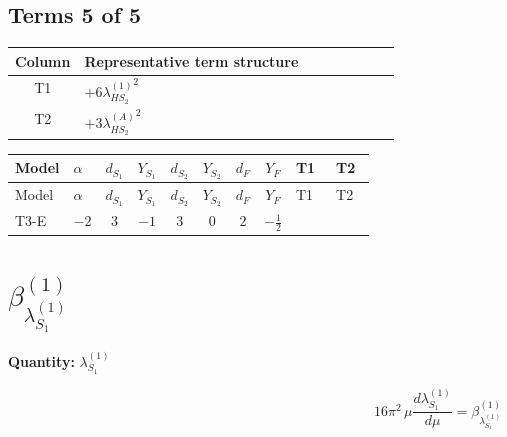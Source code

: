 \documentclass[8pt]{article}
\begin{document}
\begin{landscape}
\subsection*{Terms 5 of 5}
\begin{center}
\begin{tabular}{@{}c >{\raggedright\arraybackslash}p{0.82\linewidth}@{}}
\toprule
Column & Representative term structure \\
\midrule
T1 & \(\displaystyle +6 {\lambda_{HS_2}^{(1)}}^2\) \\
\midrule
T2 & \(\displaystyle +3 {\lambda_{HS_2}^{(A)}}^2\) \\
\midrule
\bottomrule
\end{tabular}
\end{center}
\smallskip
\tiny
\begin{longtable}{@{}llcccccc >{\raggedright\arraybackslash}p{0.21\linewidth} >{\raggedright\arraybackslash}p{0.21\linewidth}@{}}
\toprule
Model & $\alpha$ & $d_{S_1}$ & $Y_{S_1}$ & $d_{S_2}$ & $Y_{S_2}$ & $d_F$ & $Y_F$ & T1 & T2 \\
\midrule
\endfirsthead
\toprule
Model & $\alpha$ & $d_{S_1}$ & $Y_{S_1}$ & $d_{S_2}$ & $Y_{S_2}$ & $d_F$ & $Y_F$ & T1 & T2 \\
\midrule
\endhead
T3-E & $-2$ & $3$ & $-1$ & $3$ & $0$ & $2$ & $-\frac{1}{2}$ & \scriptsize\adjustbox{max width=\linewidth}{$\begin{gathered} +6 {\lambda_{HS_2}^{(1)}}^2\end{gathered}$} & \scriptsize\adjustbox{max width=\linewidth}{$\begin{gathered} +3 {\lambda_{HS_2}^{(A)}}^2\end{gathered}$} \\
\midrule
\bottomrule
\end{longtable}
\clearpage
\section*{$\beta_{\lambda_{S_1}^{(1)}}^{(1)}$}
\noindent\textbf{Quantity: }$\lambda_{S_1}^{(1)}$\par\smallskip
\[16\pi^2\,\mu\frac{d \lambda_{S_1}^{(1)}}{d\mu}=\beta_{\lambda_{S_1}^{(1)}}^{(1)}\]

\end{landscape}
\end{document}
